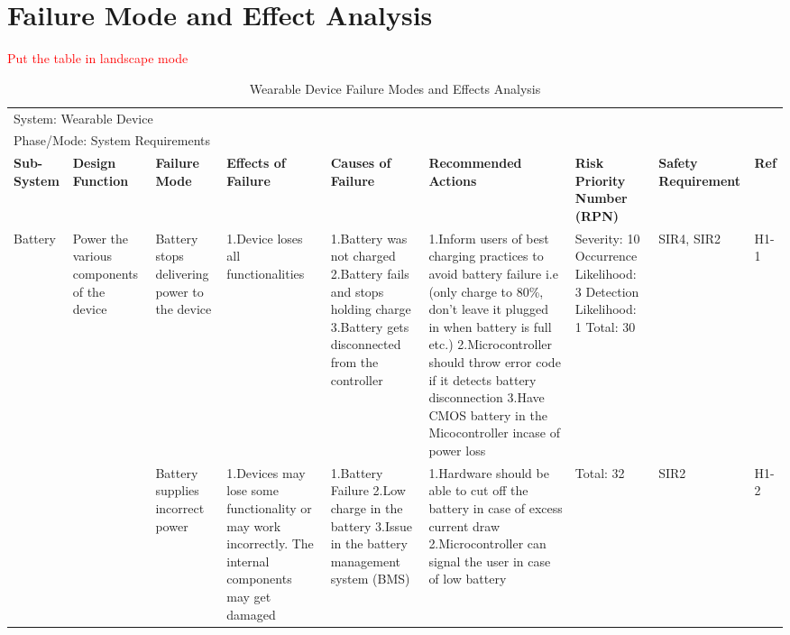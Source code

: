 \documentclass[12pt, titlepage]{article}
\begin{document}
\section{Failure Mode and Effect Analysis}
\textcolor{red}{Put the table in landscape mode}

\begin{landscape}
\begin{table}[H]
\centering
    \caption{Wearable Device Failure Modes and Effects Analysis}
	
    \begin{tabular}{| p{} | p{}  | p{} | p{} | p{} | p{} | p{} | p{} | p{} |}
    \hline
    
    \multicolumn{9}{|l|}{System: Wearable Device} \\
    \multicolumn{9}{|l|}{Phase/Mode: System Requirements} \\ \hline
    \textbf{Sub-System} & \textbf{Design Function} & \textbf{Failure Mode} & \textbf{Effects of Failure} & \textbf{Causes of Failure} & \textbf{Recommended Actions} & \textbf{Risk Priority Number (RPN)} & \textbf{Safety Requirement} & \textbf{Ref} \\ \hline

    Battery & Power the various components of the device  & Battery stops delivering power to the device & 1.Device loses all functionalities & 1.Battery was not charged \newline 2.Battery fails and stops holding charge \newline 3.Battery gets disconnected from the controller & 1.Inform users of best charging practices to avoid battery failure i.e (only charge to 80\%, don't leave it plugged in when battery is full etc.) \newline 2.Microcontroller should throw error code if it detects battery disconnection \newline 3.Have CMOS battery in the Micocontroller incase of power loss & Severity: 10 \newline Occurrence Likelihood: 3 \newline Detection Likelihood: 1 \newline Total: 30 & SIR4, SIR2 & H1-1 \\ \cline{3-9}
    
     & & Battery supplies incorrect power & 1.Devices may lose some functionality or may work incorrectly. The internal components may get damaged & 1.Battery Failure \newline 2.Low charge in the battery \newline 3.Issue in the battery management system (BMS) & 1.Hardware should be able to cut off the battery in case of excess current draw \newline 2.Microcontroller can signal the user in case of low battery & Total: 32 & SIR2 & H1-2 \\ \cline{1-9}


\end{tabular}
\end{table}
\end{landscape}
\end{document}
